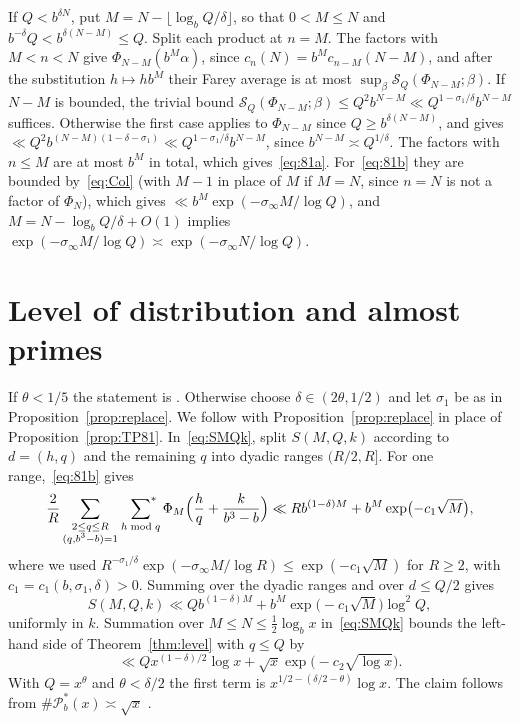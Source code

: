 \documentclass[11pt]{amsart}
\makeatletter
\theoremstyle{definition}
\numberwithin{equation}{section}
\renewenvironment{proof}[1][\proofname]{\par\pushQED{\qed}\normalfont\topsep6\p@\@plus6\p@\relax\trivlist\item[\hskip\labelsep\upshape#1.]\ignorespaces}{\popQED\endtrivlist\@endpefalse}
\newcommand{\PP}{\mathscr{P}}
\newcommand{\sumstar}{\sideset{}{^*}\sum}
\newcommand{\FS}{\mathcal{S}}
\makeatother
\begin{document}
\begin{proof}
If $Q<b^{\delta N}$, put $M=N-\lfloor\log_bQ/\delta\rfloor$, so that $0<M\le N$ and $b^{-\delta}Q<b^{\delta(N-M)}\le Q$. Split each product at $n=M$. The factors with $M<n<N$ give $\Phi_{N-M}(b^M\alpha)$, since $c_n(N)=b^Mc_{n-M}(N-M)$, and after the substitution $h\mapsto hb^M$ their Farey average is at most $\sup_\beta\FS_Q(\Phi_{N-M};\beta)$. If $N-M$ is bounded, the trivial bound $\FS_Q(\Phi_{N-M};\beta)\le Q^2b^{N-M}\ll Q^{1-\sigma_1/\delta}b^{N-M}$ suffices. Otherwise the first case applies to $\Phi_{N-M}$ since $Q\ge b^{\delta(N-M)}$, and gives $\ll Q^2b^{(N-M)(1-\delta-\sigma_1)}\ll Q^{1-\sigma_1/\delta}b^{N-M}$, since $b^{N-M}\asymp Q^{1/\delta}$. The factors with $n\le M$ are at most $b^M$ in total, which gives~\eqref{eq:81a}. For~\eqref{eq:81b} they are bounded by~\eqref{eq:Col} (with $M-1$ in place of $M$ if $M=N$, since $n=N$ is not a factor of $\Phi_N$), which gives $\ll b^M\exp(-\sigma_\infty M/\log Q)$, and $M=N-\log_bQ/\delta+O(1)$ implies $\exp(-\sigma_\infty M/\log Q)\asymp\exp(-\sigma_\infty N/\log Q)$.
\end{proof}

\section{Level of distribution and almost primes}\label{sec:level}

\begin{proof}[Proof of Theorem~\ref{thm:level}]
If $\theta<1/5$ the statement is \cite[Thm.~1.5]{TP}. Otherwise choose $\delta\in(2\theta,1/2)$ and let $\sigma_1$ be as in Proposition~\ref{prop:replace}. We follow \cite[Sect.~9]{TP} with Proposition~\ref{prop:replace} in place of Proposition~\ref{prop:TP81}. In~\eqref{eq:SMQk}, split $S(M,Q,k)$ according to $d=(h,q)$ and the remaining $q$ into dyadic ranges $(R/2,R]$. For one range,~\eqref{eq:81b} gives
\[
\frac2R\sum_{\substack{2\le q\le R\\(q,b^3-b)=1}}\ \sumstar_{h\bmod q}\Phi_M\Bigl(\frac hq+\frac{k}{b^3-b}\Bigr)\ll Rb^{(1-\delta)M}+b^M\exp\bigl(-c_1\sqrt M\bigr),
\]
where we used $R^{-\sigma_1/\delta}\exp(-\sigma_\infty M/\log R)\le\exp(-c_1\sqrt M)$ for $R\ge2$, with $c_1=c_1(b,\sigma_1,\delta)>0$. Summing over the dyadic ranges and over $d\le Q/2$ gives
\[
S(M,Q,k)\ll Qb^{(1-\delta)M}+b^M\exp\bigl(-c_1\sqrt M\bigr)\log^2Q,
\]
uniformly in $k$. Summation over $M\le N\le\frac12\log_bx$ in~\eqref{eq:SMQk} bounds the left-hand side of Theorem~\ref{thm:level} with $q\le Q$ by
\[
\ll Qx^{(1-\delta)/2}\log x+\sqrt x\exp\bigl(-c_2\sqrt{\log x}\bigr).
\]
With $Q=x^{\theta}$ and $\theta<\delta/2$ the first term is $x^{1/2-(\delta/2-\theta)}\log x$. The claim follows from $\#\PP_b^*(x)\asymp\sqrt x$ \cite[Sect.~9]{TP}.
\end{proof}
\end{document}
